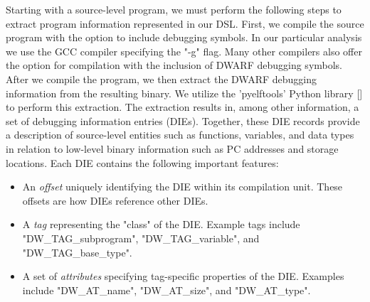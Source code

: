 Starting with a source-level program, we must perform the following steps to extract program information represented in our DSL. First, we compile the source program with the option to include debugging symbols. In our particular analysis we use the GCC compiler specifying the "-g" flag. Many other compilers also offer the option for compilation with the inclusion of DWARF debugging symbols. After we compile the program, we then extract the DWARF debugging information from the resulting binary. We utilize the 'pyelftools' Python library [] to perform this extraction. The extraction results in, among other information, a set of debugging information entries (DIEs). Together, these DIE records provide a description of source-level entities such as functions, variables, and data types in relation to low-level binary information such as PC addresses and storage locations. Each DIE contains the following important features:

\begin{itemize}
    \item An \emph{offset} uniquely identifying the DIE within its compilation unit. These offsets are how DIEs reference other DIEs.
    \item A \emph{tag} representing the "class" of the DIE. Example tags include "DW\_TAG\_subprogram", "DW\_TAG\_variable", and "DW\_TAG\_base\_type".
    \item A set of \emph{attributes} specifying tag-specific properties of the DIE. Examples include "DW\_AT\_name", "DW\_AT\_size", and "DW\_AT\_type".
\end{itemize}

